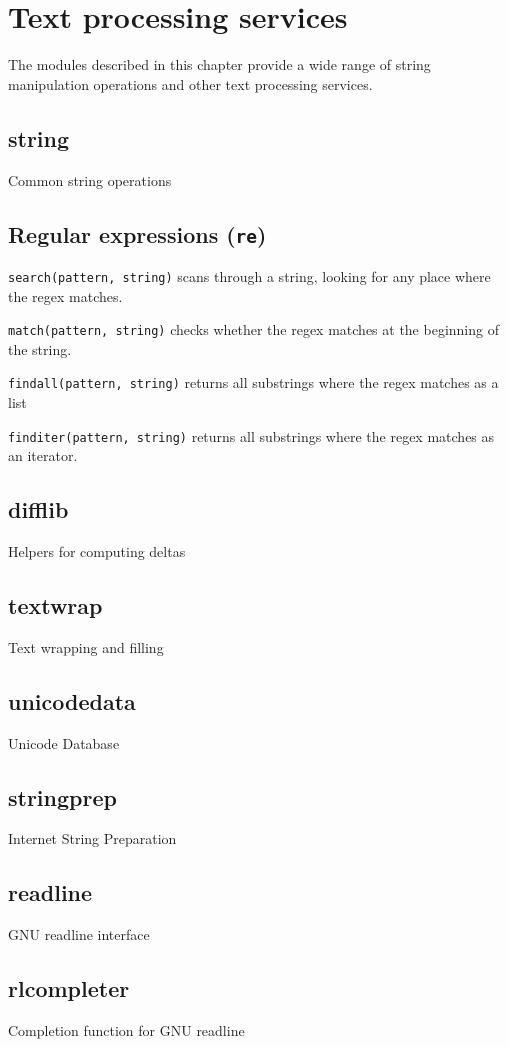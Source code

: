 \section{Text processing services}
The modules described in this chapter provide a wide range of string manipulation operations and other text processing services.
\subsection{string}
Common string operations

\subsection{Regular expressions (\texttt{re})}
\begin{compactitem}
	\item \texttt{search(pattern, string)} scans through a string, looking for any
place where the regex matches.
	\item \texttt{match(pattern, string)} checks whether the regex matches at the
beginning of the string.
	\item \texttt{findall(pattern, string)} returns all substrings where the regex
matches as a list
	\item \texttt{finditer(pattern, string)} returns all substrings where the regex
matches as an iterator.
\end{compactitem}

\subsection{difflib}
Helpers for computing deltas
\subsection{textwrap}
Text wrapping and filling
\subsection{unicodedata}
Unicode Database
\subsection{stringprep}
Internet String Preparation
\subsection{readline}
GNU readline interface
\subsection{rlcompleter}
Completion function for GNU readline
